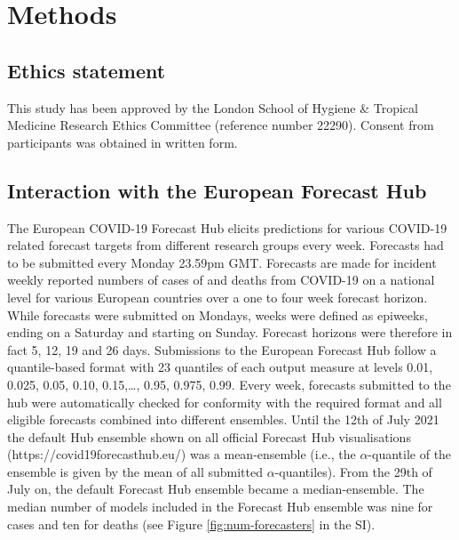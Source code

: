 \documentclass[10pt,a4paper,twocolumn]{article}
\begin{document}

\section*{Methods}

\subsection*{Ethics statement}
This study has been approved by the London School of Hygiene \& Tropical Medicine Research Ethics Committee (reference number 22290). Consent from participants was obtained in written form.

\subsection*{Interaction with the European Forecast Hub}

The European COVID-19 Forecast Hub \cite{sherrattPredictivePerformanceMultimodel2022a} elicits predictions for various COVID-19 related forecast targets from different research groups every week. Forecasts had to be submitted every Monday 23.59pm GMT. Forecasts are made for incident weekly reported numbers of cases of and deaths from COVID-19 on a national level for various European countries over a one to four week forecast horizon. While forecasts were submitted on Mondays, weeks were defined as epiweeks, ending on a Saturday and starting on Sunday. Forecast horizons were therefore in fact 5, 12, 19 and 26 days. Submissions to the European Forecast Hub follow a quantile-based format with 23 quantiles of each output measure at levels 0.01, 0.025, 0.05, 0.10, 0.15,…, 0.95, 0.975, 0.99.
Every week, forecasts submitted to the hub were automatically checked for conformity with the required format and all eligible forecasts combined into different ensembles. Until the 12th of July 2021 the default Hub ensemble shown on all official Forecast Hub visualisations (https://covid19forecasthub.eu/) was a mean-ensemble (i.e., the $\alpha$-quantile of the ensemble is given by the mean of all submitted $\alpha$-quantiles). From the 29th of July on, the default Forecast Hub ensemble became a median-ensemble. The median number of models included in the Forecast Hub ensemble was nine for cases and ten for deaths (see Figure \ref{fig:num-forecasters} in the SI). 
\end{document}
